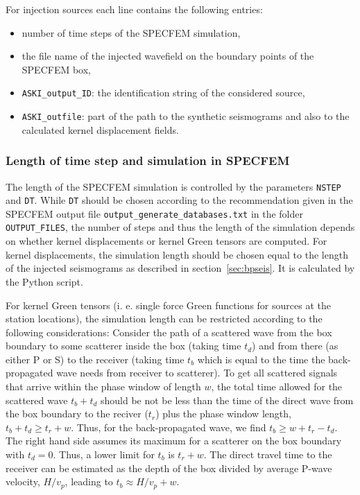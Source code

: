 For injection sources each line contains the following entries:
\begin{itemize}
	\setlength{\itemsep}{-0.1cm}
   \item number of time steps of the SPECFEM simulation,
   \item the file name of the injected wavefield on the boundary points of the SPECFEM box,
   \item \verb+ASKI_output_ID+: the identification string of the considered source,
   \item \verb+ASKI_outfile+: part of the path to the synthetic seismograms and also to the calculated kernel displacement fields.
\end{itemize}
%
\subsubsection{Length of time step and simulation in SPECFEM}
%
 The length of the SPECFEM simulation is controlled by the parameters \verb+NSTEP+ and \verb+DT+. While \verb+DT+ should be chosen according to the recommendation given in the SPECFEM output file \verb+output_generate_databases.txt+ in the folder \verb+OUTPUT_FILES+, the number of steps and thus the length of the simulation depends on whether kernel displacements or kernel Green tensors are computed. For kernel displacements, the simulation length should be chosen equal to the length of the injected seismograms as described in section~\ref{sec:bpseis}. It is calculated by the Python script.

  For kernel Green tensors (i. e. single force Green functions for sources at the station locations), the simulation length can be restricted according to the following considerations: Consider the path of a scattered wave from the box boundary to some scatterer inside the box (taking time $t_d$) and from there (as either P or S) to the receiver (taking time $t_b$ which is equal to the time the back-propagated wave needs from receiver to scatterer). To get all scattered signals that arrive within the phase window of length $w$, the total time allowed for the scattered wave $t_b+t_d$ should be not be less than the time of the direct wave from the box boundary to the reciver ($t_r$) plus the phase window length, $t_b+t_d \geq t_r+w$. Thus, for the back-propagated wave, we find $t_b \geq w+t_r-t_d$. The right hand side assumes its maximum for a scatterer on the box boundary with $t_d=0$. Thus, a lower limit for $t_b$ is $t_r+w$. The direct travel time to the receiver can be estimated as the depth of the box divided by average P-wave velocity, $H/v_p$, leading to $t_b\approx H/v_p+w$.
%
